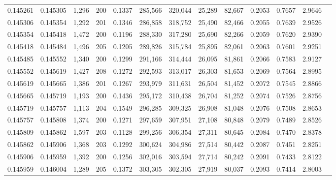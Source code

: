 \begin{tabular}{rrrrrrrrrrrrr}
0.145261 & 0.145305 & 1,296 & 200 &                                     0.1337 & 285,566 & 320,044 &  25,289 &  82,667 & 0.2053 & 0.7657 & 2.9646 \\
0.145306 & 0.145354 & 1,292 & 201 &                                     0.1346 & 286,858 & 318,752 &  25,490 &  82,466 & 0.2055 & 0.7639 & 2.9526 \\
0.145354 & 0.145418 & 1,472 & 200 &                                     0.1196 & 288,330 & 317,280 &  25,690 &  82,266 & 0.2059 & 0.7620 & 2.9390 \\
0.145418 & 0.145484 & 1,496 & 205 &                                     0.1205 & 289,826 & 315,784 &  25,895 &  82,061 & 0.2063 & 0.7601 & 2.9251 \\
0.145485 & 0.145552 & 1,340 & 200 &                                     0.1299 & 291,166 & 314,444 &  26,095 &  81,861 & 0.2066 & 0.7583 & 2.9127 \\
0.145552 & 0.145619 & 1,427 & 208 &                                     0.1272 & 292,593 & 313,017 &  26,303 &  81,653 & 0.2069 & 0.7564 & 2.8995 \\
0.145619 & 0.145665 & 1,386 & 201 &                                     0.1267 & 293,979 & 311,631 &  26,504 &  81,452 & 0.2072 & 0.7545 & 2.8866 \\
0.145665 & 0.145719 & 1,193 & 200 &                                     0.1436 & 295,172 & 310,438 &  26,704 &  81,252 & 0.2074 & 0.7526 & 2.8756 \\
0.145719 & 0.145757 & 1,113 & 204 &                                     0.1549 & 296,285 & 309,325 &  26,908 &  81,048 & 0.2076 & 0.7508 & 2.8653 \\
0.145757 & 0.145808 & 1,374 & 200 &                                     0.1271 & 297,659 & 307,951 &  27,108 &  80,848 & 0.2079 & 0.7489 & 2.8526 \\
0.145809 & 0.145862 & 1,597 & 203 &                                     0.1128 & 299,256 & 306,354 &  27,311 &  80,645 & 0.2084 & 0.7470 & 2.8378 \\
0.145862 & 0.145906 & 1,368 & 203 &                                     0.1292 & 300,624 & 304,986 &  27,514 &  80,442 & 0.2087 & 0.7451 & 2.8251 \\
0.145906 & 0.145959 & 1,392 & 200 &                                     0.1256 & 302,016 & 303,594 &  27,714 &  80,242 & 0.2091 & 0.7433 & 2.8122 \\
0.145959 & 0.146004 & 1,289 & 205 &                                     0.1372 & 303,305 & 302,305 &  27,919 &  80,037 & 0.2093 & 0.7414 & 2.8003 \\

\end{tabular}
